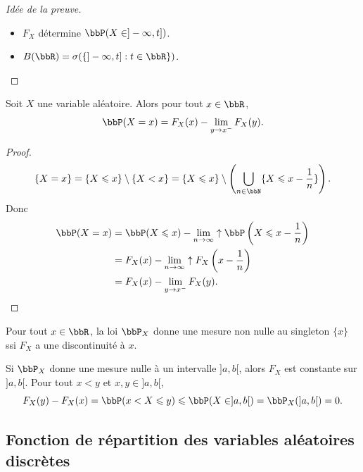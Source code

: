 \begin{proof}[Idée de la preuve] $\ $
    \begin{itemize}
        \item $F_X$ détermine $\bbP(X \in ]-\infty, t])$.
        \item $B(\bbR) = \sigma(\{ ]-\infty, t]: t \in \bbR \})$. \qedhere
    \end{itemize}
\end{proof}

\begin{prop}
    Soit $X$ une variable aléatoire.
    Alors pour tout $x \in \bbR$,
    \[ \bbP(X = x) = F_X(x) - \lim_{y \to x^-} F_X(y). \]
\end{prop}

\begin{proof}
    \[ \{ X = x \} = \{ X \leqslant x \} \setminus \{ X < x \} =
        \{ X \leqslant x \} \setminus \left( \bigcup_{n \in \bbN} \{ X \leqslant x - \frac{1}{n} \} \right). \]
    Donc
    \begin{align*}
        \bbP(X = x) & = \bbP(X \leqslant x) - \lim_{n \to \infty} \uparrow \bbP\left(X \leqslant x - \frac{1}{n}\right) \\
                    & = F_X(x) - \lim_{n \to \infty} \uparrow F_X\left(x - \frac{1}{n}\right)                           \\
                    & = F_X(x) - \lim_{y \to x^-} F_X(y). \qedhere
    \end{align*}
\end{proof}

\begin{rqq}[Interprétation]
    Pour tout $x \in \bbR$,
    la loi $\bbP_X$ donne une mesure non nulle au singleton $\{ x \}$ ssi $F_X$ a une discontinuité à $x$.
\end{rqq}

\begin{rqq}
    Si $\bbP_X$ donne une mesure nulle à un intervalle $]a, b[$,
                    alors $F_X$ est constante sur $]a, b[$.
                    Pour tout $x < y$ et $x, y \in ]a, b[$,
    \[ F_X(y) - F_X(x) = \bbP(x < X \leqslant y) \leqslant \bbP(X \in ]a, b[) = \bbP_X(]a, b[) = 0. \]
\end{rqq}

\subsection{Fonction de répartition des variables aléatoires discrètes}

